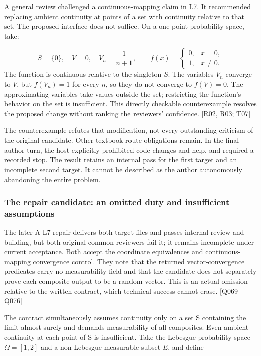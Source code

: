A general review challenged a continuous-mapping claim in L7. It recommended replacing ambient continuity at points of a set with continuity relative to that set. The proposed interface does not suffice. On a one-point probability space, take:

\[
S=\{0\},\quad V=0,\quad V_n=\frac1{n+1},\qquad
f(x)=\begin{cases}0,&x=0,\\1,&x\ne0.\end{cases}
\]
The function is continuous relative to the singleton $S$. The variables $V_n$ converge to $V$, but $f(V_n)=1$ for every $n$, so they do not converge to $f(V)=0$. The approximating variables take values outside the set; restricting the function's behavior on the set is insufficient. This directly checkable counterexample resolves the proposed change without ranking the reviewers' confidence. [R02, R03; T07]

The counterexample refutes that modification, not every outstanding criticism of the original candidate. Other textbook-route obligations remain. In the final author turn, the host explicitly prohibited code changes and help, and required a recorded stop. The result retains an internal pass for the first target and an incomplete second target. It cannot be described as the author autonomously abandoning the entire problem.

\subsubsection[The repair candidate: an omitted duty and insufficient assumptions]{\texorpdfstring{\protect\hypertarget{g16-1}{}The repair candidate: an omitted duty and insufficient assumptions}{The repair candidate: an omitted duty and insufficient assumptions}}
The later A-L7 repair delivers both target files and passes internal review and building, but both original common reviewers fail it; it remains incomplete under current acceptance. Both accept the coordinate equivalences and continuous-mapping convergence control. They note that the returned vector-convergence predicates carry no measurability field and that the candidate does not separately prove each composite output to be a random vector. This is an actual omission relative to the written contract, which technical success cannot erase. [Q069-Q076]

The contract simultaneously assumes continuity only on a set S containing the limit almost surely and demands measurability of all composites. Even ambient continuity at each point of S is insufficient. Take the Lebesgue probability space $\Omega=[1,2]$ and a non-Lebesgue-measurable subset $E$, and define

